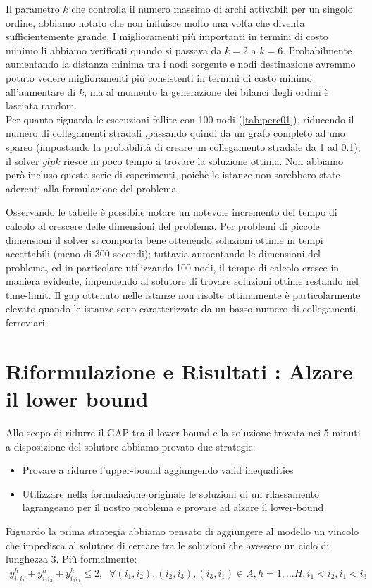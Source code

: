 \documentclass{article}
\begin{document}
Il parametro $k$ che controlla il numero massimo di archi attivabili per un singolo ordine, abbiamo notato che non influisce molto una volta che diventa sufficientemente grande. I miglioramenti più importanti in termini di costo minimo li abbiamo verificati quando si passava da $k = 2$ a $k = 6$. Probabilmente aumentando la distanza minima tra i nodi sorgente e nodi destinazione avremmo potuto vedere miglioramenti più consistenti in termini di costo minimo all'aumentare di $k$, ma al momento la generazione dei bilanci degli ordini è lasciata random.
\\
Per quanto riguarda le esecuzioni fallite con 100 nodi (\cref{tab:perc01}), riducendo il numero di collegamenti stradali ,passando quindi da un grafo completo ad uno sparso (impostando la probabilità di creare un collegamento stradale da 1 ad 0.1), il solver $glpk$ riesce in poco tempo a trovare la soluzione ottima. Non abbiamo però incluso questa serie di esperimenti, poichè le istanze non sarebbero state aderenti alla formulazione del problema.


Osservando le tabelle è possibile notare un notevole incremento del tempo di calcolo al crescere delle dimensioni del problema. Per problemi di piccole dimensioni il solver si comporta bene ottenendo soluzioni ottime in tempi accettabili (meno di 300 secondi); tuttavia aumentando le dimensioni del problema, ed in particolare utilizzando 100 nodi, il tempo di calcolo cresce in maniera evidente, impendendo al solutore di trovare soluzioni ottime restando nel time-limit. 
Il gap ottenuto nelle istanze non risolte ottimamente è particolarmente elevato quando le istanze sono caratterizzate da un basso numero di collegamenti ferroviari.


\section{Riformulazione e Risultati : Alzare il lower bound}

Allo scopo di ridurre il GAP tra il lower-bound e la soluzione trovata nei 5 minuti a disposizione del solutore abbiamo provato due strategie:
\begin{itemize}
    \item Provare a ridurre l'upper-bound aggiungendo valid inequalities
    \item Utilizzare nella formulazione originale le soluzioni di un rilassamento lagrangeano per il nostro problema e provare ad alzare il lower-bound
\end{itemize}
Riguardo la prima strategia abbiamo pensato di aggiungere al modello un vincolo che impedisca al solutore di cercare tra le soluzioni che avessero un ciclo di lunghezza 3. Più formalmente:
\begin{align}
    y_{i_{1}i_{2}}^h + y_{i_{2}i_{3}}^h + y_{i_{3}i_{1}}^h \leq 2, \; \;
    \forall (i_1,i_2), (i_2,i_3), (i_3,i_1)   \in A , h=1, ... H,
    i_1 < i_2, i_1 < i_3
\end{align}
\end{document}
